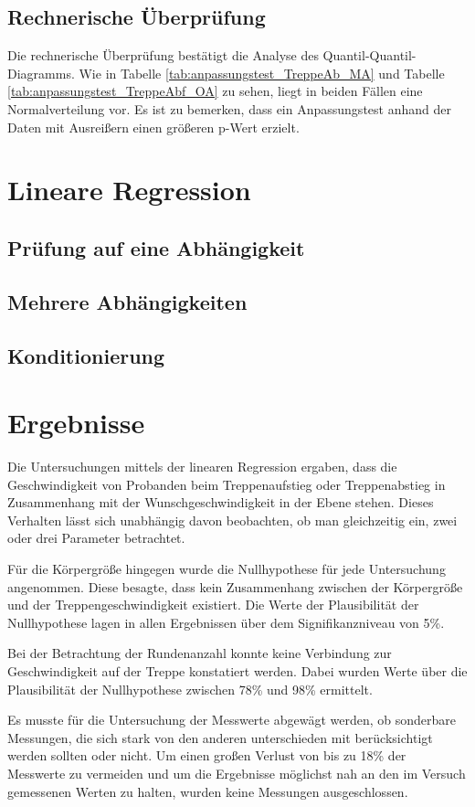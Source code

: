 \subsection{Rechnerische Überprüfung}
Die rechnerische Überprüfung bestätigt die Analyse des Quantil-Quantil-Diagramms. Wie in Tabelle \ref{tab:anpassungstest_TreppeAb_MA} und Tabelle \ref{tab:anpassungstest_TreppeAbf_OA} zu sehen, liegt in beiden Fällen eine Normalverteilung vor. Es ist zu bemerken, dass ein Anpassungstest anhand der Daten mit Ausreißern einen größeren p-Wert erzielt. 


\section{Lineare Regression}
\subsection{Prüfung auf eine Abhängigkeit}
\subsection{Mehrere Abhängigkeiten}
\subsection{Konditionierung}

\section{Ergebnisse}
Die Untersuchungen mittels der linearen Regression ergaben, dass die Geschwindigkeit von Probanden beim Treppenaufstieg oder Treppenabstieg in Zusammenhang mit der Wunschgeschwindigkeit in der Ebene stehen. Dieses Verhalten lässt sich unabhängig davon beobachten, ob man gleichzeitig ein, zwei oder drei Parameter betrachtet.

Für die Körpergröße hingegen wurde die Nullhypothese für jede Untersuchung angenommen. Diese besagte, dass kein Zusammenhang zwischen der Körpergröße und der Treppengeschwindigkeit existiert. Die Werte der Plausibilität der Nullhypothese lagen in allen Ergebnissen über dem Signifikanzniveau von 5\%.

Bei der Betrachtung der Rundenanzahl konnte keine Verbindung zur Geschwindigkeit auf der Treppe konstatiert werden. Dabei wurden Werte über die Plausibilität der Nullhypothese zwischen 78\% und 98\% ermittelt.

Es musste für die Untersuchung der Messwerte abgewägt werden, ob sonderbare Messungen, die sich stark von den anderen unterschieden mit berücksichtigt werden sollten oder nicht. Um einen großen Verlust von bis zu 18\% der Messwerte zu vermeiden und um die Ergebnisse möglichst nah an den im Versuch gemessenen Werten zu halten, wurden keine Messungen ausgeschlossen.
